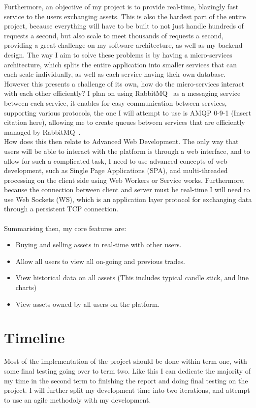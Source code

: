 \documentclass[titlepage]{article}
\begin{document}
\noindent
Furthermore, an objective of my project is to provide real-time, blazingly fast service to the users exchanging assets. This is also the hardest part of the entire project, because everything will have to be built to not just handle hundreds of requests a second, but also scale to meet thousands of requests a second, providing a great challenge on my software architecture, as well as my backend design. The way I aim to solve these problems is by having a micro-services architecture, which splits the entire application into smaller services that can each scale individually, as well as each service having their own database. However this presents a challenge of its own, how do the micro-services interact with each other efficiently? I plan on using RabbitMQ~\cite{rabbitmq} as a messaging service between each service, it enables for easy communication between services, supporting various protocols, the one I will attempt to use is AMQP 0-9-1 (Insert citation here), allowing me to create queues between services that are efficiently managed by RabbitMQ~\cite{rabbitmq}. \\

\noindent
How does this then relate to Advanced Web Development. The only way that users will be able to interact with the platform is through a web interface, and to allow for such a complicated task, I need to use advanced concepts of web development, such as Single Page Applications (SPA), and multi-threaded processing on the client side using Web Workers or Service works. Furthermore, because the connection between client and server must be real-time I will need to use Web Sockets (WS), which is an application layer protocol for exchanging data through a persistent TCP connection. \\
\\
Summarising then, my core features are:
\begin{itemize}
	\item Buying and selling assets in real-time with other users.
	\item Allow all users to view all on-going and previous trades.
	\item View historical data on all assets (This includes typical candle stick, and line charts)
	\item View assets owned by all users on the platform.
\end{itemize}

\pagebreak

\section{Timeline}
Most of the implementation of the project should be done within term one, with some final testing going over to term two. Like this I can dedicate the majority of my time in the second term to finishing the report and doing final testing on the project. I will further split my development time into two iterations, and attempt to use an agile methodoly with my development.
\end{document}
